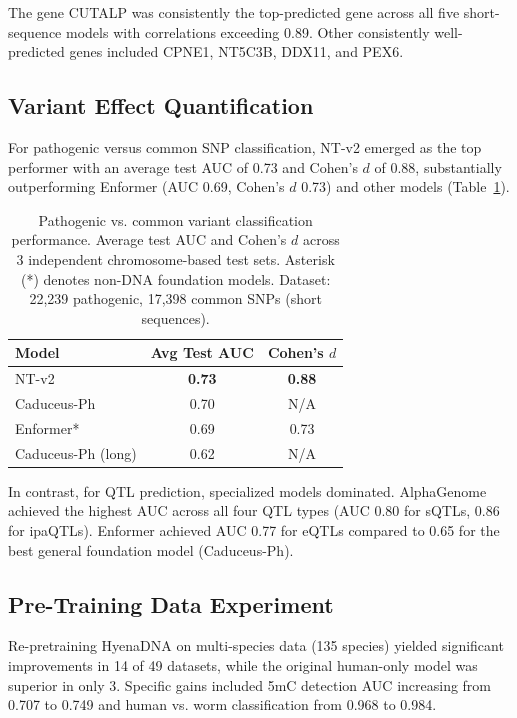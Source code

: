 \documentclass[11pt]{article}
\begin{document}
The gene CUTALP was consistently the top-predicted gene across all five short-sequence models with correlations exceeding 0.89. Other consistently well-predicted genes included CPNE1, NT5C3B, DDX11, and PEX6.

\subsection{Variant Effect Quantification}

For pathogenic versus common SNP classification, NT-v2 emerged as the top performer with an average test AUC of 0.73 and Cohen's $d$ of 0.88, substantially outperforming Enformer (AUC 0.69, Cohen's $d$ 0.73) and other models (Table~\ref{tab:variant}).

\begin{table}[htbp]
\centering
\caption{Pathogenic vs. common variant classification performance. Average test AUC and Cohen's $d$ across 3 independent chromosome-based test sets. Asterisk (*) denotes non-DNA foundation models. Dataset: 22,239 pathogenic, 17,398 common SNPs (short sequences).}
\label{tab:variant}
\begin{tabular}{lcc}
\toprule
Model & Avg Test AUC & Cohen's $d$ \\
\midrule
NT-v2 & \textbf{0.73} & \textbf{0.88} \\
Caduceus-Ph & 0.70 & N/A \\
Enformer* & 0.69 & 0.73 \\
Caduceus-Ph (long) & 0.62 & N/A \\
\bottomrule
\end{tabular}
\end{table}

In contrast, for QTL prediction, specialized models dominated. AlphaGenome achieved the highest AUC across all four QTL types (AUC 0.80 for sQTLs, 0.86 for ipaQTLs). Enformer achieved AUC 0.77 for eQTLs compared to 0.65 for the best general foundation model (Caduceus-Ph).

\subsection{Pre-Training Data Experiment}

Re-pretraining HyenaDNA on multi-species data (135 species) yielded significant improvements in 14 of 49 datasets, while the original human-only model was superior in only 3. Specific gains included 5mC detection AUC increasing from 0.707 to 0.749 and human vs. worm classification from 0.968 to 0.984.
\end{document}
